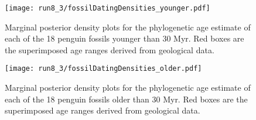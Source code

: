 \documentclass[11pt]{article}
\begin{document}
\begin{figure}
\texttt{[image: run8\_3/fossilDatingDensities\_younger.pdf]}
\caption{Marginal posterior density plots for the phylogenetic age estimate of each of the 18 penguin fossils younger than 30 Myr. Red boxes are the superimposed age ranges derived from geological data.}
\end{figure}

\begin{figure}
\texttt{[image: run8\_3/fossilDatingDensities\_older.pdf]}
\caption{Marginal posterior density plots for the phylogenetic age estimate of each of the 18 penguin fossils older than 30 Myr. Red boxes are the superimposed age ranges derived from geological data.}
\end{figure}

\end{document}
